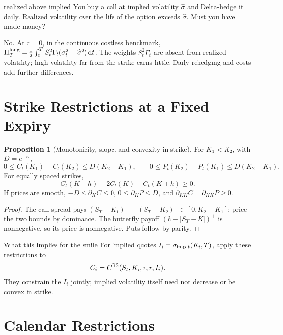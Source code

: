 \documentclass[10pt]{article}
\newcommand{\1}{\mathbf 1}
\newcommand{\dd}{\,\mathrm d}
\theoremstyle{definition}
\newtheorem{proposition}[definition]{Proposition}
\begin{document}
\begin{studentexercise}{realized above implied}
You buy a call at implied volatility \(\widehat\sigma\) and Delta-hedge it
daily. Realized volatility over the life of the option exceeds
\(\widehat\sigma\). Must you have made money?
\end{studentexercise}
\begin{shortsolution}
No. At \(r=0\), in the continuous costless benchmark,
\(\Pi_T^{\rm long}=\tfrac12\int_0^TS_t^2\Gamma_t(\sigma_t^2-\widehat\sigma^2)\dd t\).
The weights \(S_t^2\Gamma_t\) are absent from realized volatility; high
volatility far from the strike earns little. Daily rehedging and costs add
further differences.
\end{shortsolution}

\section{Strike Restrictions at a Fixed Expiry}

\begin{proposition}[Monotonicity, slope, and convexity in strike]
For \(K_1<K_2\), with \(D=e^{-r\tau}\),
\[
\boxed{0\le C_t(K_1)-C_t(K_2)\le D(K_2-K_1),\qquad
0\le P_t(K_2)-P_t(K_1)\le D(K_2-K_1).}
\]
For equally spaced strikes,
\[
\boxed{C_t(K-h)-2C_t(K)+C_t(K+h)\ge0.}
\]
If prices are smooth, \(-D\le\partial_K C\le0\), \(0\le\partial_KP\le D\),
and \(\partial_{KK}C=\partial_{KK}P\ge0\).
\end{proposition}
\begin{proof}
The call spread pays \((S_T-K_1)^+-(S_T-K_2)^+\in[0,K_2-K_1]\); price the two
bounds by dominance. The butterfly payoff \((h-|S_T-K|)^+\) is nonnegative,
so its price is nonnegative. Puts follow by parity.
\end{proof}

\begin{warningbox}{What this implies for the smile}
For implied quotes \(I_i=\sigma_{{\rm imp},t}(K_i,T)\), apply these
restrictions to
\[
C_i=C^{\rm BS}(S_t,K_i,\tau,r,I_i).
\]
They constrain the \(I_i\) jointly; implied volatility itself need not
decrease or be convex in strike.
\end{warningbox}

\section{Calendar Restrictions}
\end{document}

